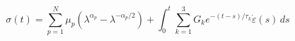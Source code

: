 \begin{theorem}
\begin{equation}
  \sigma(t) = \sum_{p=1}^{N} \mu_p (\lambda^{\alpha_p} - \lambda^{-\alpha_p/2}) + \int_0^t \sum_{k=1}^{3} G_k e^{-(t-s)/\tau_k} \dot{\varepsilon}(s)\,ds
\end{equation}
\end{theorem}
